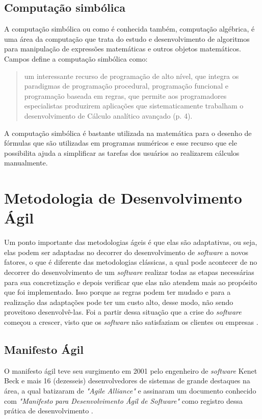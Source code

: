 {{\subsection{Computação simbólica}
\noindent A computação simbólica ou como é conhecida também, computação algébrica, é uma área da computação que trata do estudo e desenvolvimento de algoritmos para manipulação de expressões matemáticas e outros objetos matemáticos. Campos \cite{2015:Lidio} define a computação simbólica como:
\begin{quote}
    um interessante recurso de programação de alto nível, que integra os paradigmas de programação procedural, programação funcional e programação baseada em regras, que permite aos programadores especialistas produzirem aplicações que sistematicamente trabalham o desenvolvimento de Cálculo analítico avançado (p. 4).  
\end{quote}
A computação simbólica é bastante utilizada na matemática para o desenho de fórmulas que são utilizadas em programas numéricos e esse recurso que ele possibilita ajuda a simplificar as tarefas dos usuários ao realizarem cálculos manualmente.

\section{Metodologia de Desenvolvimento Ágil}
\noindent Um ponto importante das metodologias ágeis é que elas são adaptativas, ou seja, elas podem ser adaptadas no decorrer do desenvolvimento de \textit{software} a novos fatores, o que é diferente das metodologias clássicas, a qual pode acontecer de no decorrer do desenvolvimento de um \textit{software} realizar todas as etapas necessárias para sua concretização e depois verificar que elas não atendem mais ao propósito que foi implementado. Isso porque as regras podem ter mudado e para a realização das adaptações pode ter um custo alto, desse modo, não sendo proveitoso desenvolvê-las. Foi a partir dessa situação que a crise do \textit{software} começou a crescer, visto que os \textit{software} não satisfaziam os clientes ou empresas \cite{2005:rezende}.

\subsection{Manifesto Ágil}
\noindent O manifesto ágil teve seu surgimento em 2001 pelo engenheiro de \textit{software} Kenet Beck e mais 16 (dezesseis) desenvolvedores de sistemas de grande destaques na área, a qual batizaram de \textit{"Agile Alliance"} e assinaram um documento conhecido com \textit{"Manifesto para Desenvolvimento Ágil de \textit{Software}"} como registro dessa prática de desenvolvimento \cite{2001:Pressman}.

}}
